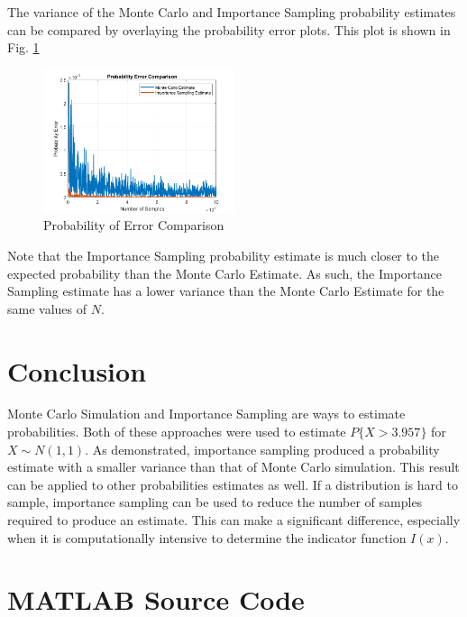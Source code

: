 \documentclass[conference]{IEEEtran}
\begin{document}
The variance of the Monte Carlo and Importance Sampling probability estimates can be compared by overlaying the probability error plots. This plot is shown in Fig. \ref{Error Overlay}
\begin{figure}[H]
\centerline{\includegraphics[width=0.5\textwidth]{Error_Overlay.png}}
\caption{Probability of Error Comparison}
\label{Error Overlay}
\end{figure}
\noindent
Note that the Importance Sampling probability estimate is much closer to the expected probability than the Monte Carlo Estimate. As such, the Importance Sampling estimate has a lower variance than the Monte Carlo Estimate for the same values of $N$.
\section{Conclusion}
Monte Carlo Simulation and Importance Sampling are ways to estimate probabilities. Both of these approaches were used to estimate $P\{X > 3.957\}$ for $X \sim N(1,1)$. As demonstrated, importance sampling produced a probability estimate with a smaller variance than that of Monte Carlo simulation. This result can be applied to other probabilities estimates as well. If a distribution is hard to sample, importance sampling can be used to reduce the number of samples required to produce an estimate. This can make a significant difference, especially when it is computationally intensive to determine the indicator function $I(x)$.
\onecolumn
\pagebreak
\appendices
\section{MATLAB Source Code}
\label{matlab_code}
\lstset{style=Matlab-editor}

\raggedbottom
\end{document}
